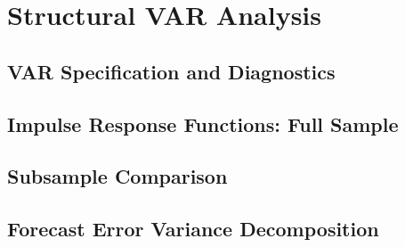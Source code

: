 
\chapter{Structural VAR Analysis}
\label{ch:svar}



\section{VAR Specification and Diagnostics}
\label{sec:svar_diagnostics}



\section{Impulse Response Functions: Full Sample}
\label{sec:svar_irf_full}



\section{Subsample Comparison}
\label{sec:svar_subsample}



\section{Forecast Error Variance Decomposition}
\label{sec:svar_fevd}

